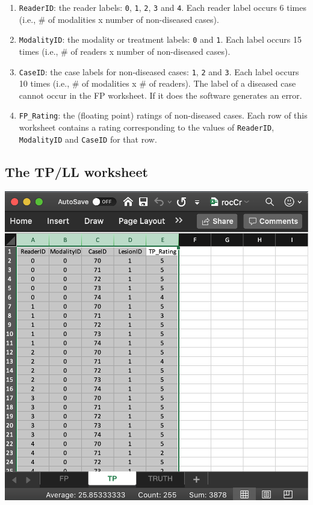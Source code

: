 \documentclass[
]{book}
\begin{document}
\begin{enumerate}
\def\labelenumi{\arabic{enumi}.}
\item
  \texttt{ReaderID}: the reader labels: \texttt{0}, \texttt{1}, \texttt{2}, \texttt{3} and \texttt{4}. Each reader label occurs 6 times (i.e., \# of modalities x number of non-diseased cases).
\item
  \texttt{ModalityID}: the modality or treatment labels: \texttt{0} and \texttt{1}. Each label occurs 15 times (i.e., \# of readers x number of non-diseased cases).
\item
  \texttt{CaseID}: the case labels for non-diseased cases: \texttt{1}, \texttt{2} and \texttt{3}. Each label occurs 10 times (i.e., \# of modalities x \# of readers). The label of a diseased case cannot occur in the FP worksheet. If it does the software generates an error.
\item
  \texttt{FP\_Rating}: the (floating point) ratings of non-diseased cases. Each row of this worksheet contains a rating corresponding to the values of \texttt{ReaderID}, \texttt{ModalityID} and \texttt{CaseID} for that row.
\end{enumerate}

\hypertarget{quick-start-roc-tp}{%
\subsection{The TP/LL worksheet}\label{quick-start-roc-tp}}

\includegraphics[width=1\textwidth,height=\textheight]{images/quick-start/rocCrTp.png}
\end{document}
